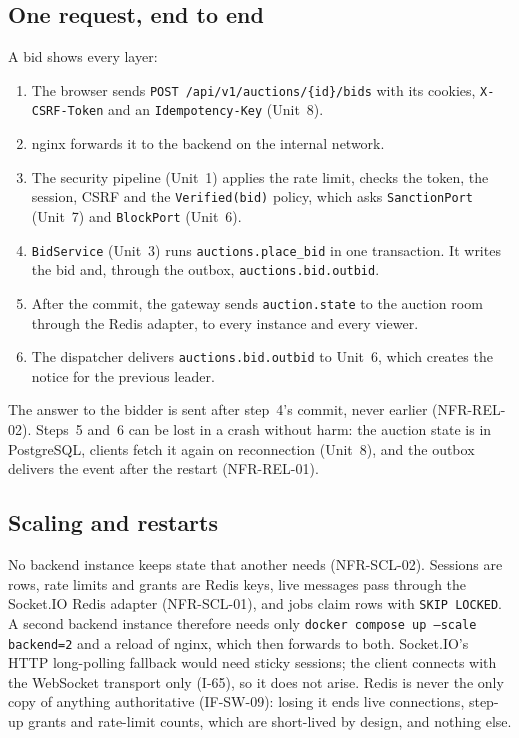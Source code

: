 \documentclass[11pt,a4paper]{article}
\begin{document}
\subsection{One request, end to end}
A bid shows every layer:
\begin{enumerate}[nosep]
  \item The browser sends \texttt{POST /api/v1/auctions/\{id\}/bids} with its cookies, \texttt{X-CSRF-Token} and an \texttt{Idempotency-Key} (Unit~8).
  \item nginx forwards it to the backend on the internal network.
  \item The security pipeline (Unit~1) applies the rate limit, checks the token, the session, CSRF and the \texttt{Verified(bid)} policy, which asks \texttt{SanctionPort} (Unit~7) and \texttt{BlockPort} (Unit~6).
  \item \texttt{BidService} (Unit~3) runs \texttt{auctions.\allowbreak place\_\allowbreak bid} in one transaction. It writes the bid and, through the outbox, \texttt{auctions.\allowbreak bid.\allowbreak outbid}.
  \item After the commit, the gateway sends \texttt{auction.state} to the auction room through the Redis adapter, to every instance and every viewer.
  \item The dispatcher delivers \texttt{auctions.\allowbreak bid.\allowbreak outbid} to Unit~6, which creates the notice for the previous leader.
\end{enumerate}
The answer to the bidder is sent after step~4's commit, never earlier (NFR-REL-02). Steps~5 and~6 can be lost in a crash without harm: the auction state is in PostgreSQL, clients fetch it again on reconnection (Unit~8), and the outbox delivers the event after the restart (NFR-REL-01).

\subsection{Scaling and restarts}
No backend instance keeps state that another needs (NFR-SCL-02). Sessions are rows, rate limits and grants are Redis keys, live messages pass through the Socket.IO Redis adapter (NFR-SCL-01), and jobs claim rows with \texttt{SKIP LOCKED}. A second backend instance therefore needs only \texttt{docker compose up --scale backend=2} and a reload of nginx, which then forwards to both. Socket.IO's HTTP long-polling fallback would need sticky sessions; the client connects with the WebSocket transport only (I-65), so it does not arise. Redis is never the only copy of anything authoritative (IF-SW-09): losing it ends live connections, step-up grants and rate-limit counts, which are short-lived by design, and nothing else.
\end{document}
